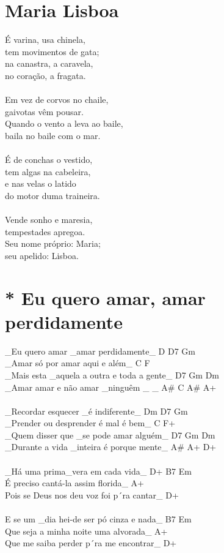 \documentclass{article}
\begin{document}
\section{ Maria Lisboa}
É varina, usa chinela,\\
tem movimentos de gata;\\
na canastra, a caravela,\\
no coração, a fragata.\\
\\
Em vez de corvos no chaile,\\
gaivotas vêm pousar.\\
Quando o vento a leva ao baile,\\
baila no baile com o mar.\\
\\
É de conchas o vestido,\\
tem algas na cabeleira,\\
e nas velas o latido\\
do motor duma traineira.\\
\\
Vende sonho e maresia,\\
tempestades apregoa.\\
Seu nome próprio: Maria;\\
seu apelido: Lisboa.\\
\section{ * Eu quero amar, amar perdidamente}
_Eu quero amar _amar perdidamente_          D   D7  Gm\\
_Amar só por amar aqui e além_              C   F\\
_Mais esta _aquela a outra e toda a gente_  D7  Gm Dm\\
_Amar amar e não amar _ninguêm _ _          A#  C   A#  A+\\
\\
_Recordar esquecer _é indiferente_          Dm  D7  Gm\\
_Prender ou desprender é mal é bem_         C   F+\\
_Quem disser que _se pode amar alguém_      D7  Gm Dm\\
_Durante a vida _inteira é porque mente_    A#  A+  D+\\
\\
_Há uma prima_vera em cada vida_            D+  B7  Em\\
É preciso cantá-la assim florida_           A+\\
Pois se Deus nos deu voz foi p´ra cantar_   D+\\
\\
E se um _dia hei-de ser pó cinza e nada_    B7  Em\\
Que seja a minha noite uma alvorada_        A+\\
Que me saiba perder p´ra me encontrar_      D+\\
\end{document}
